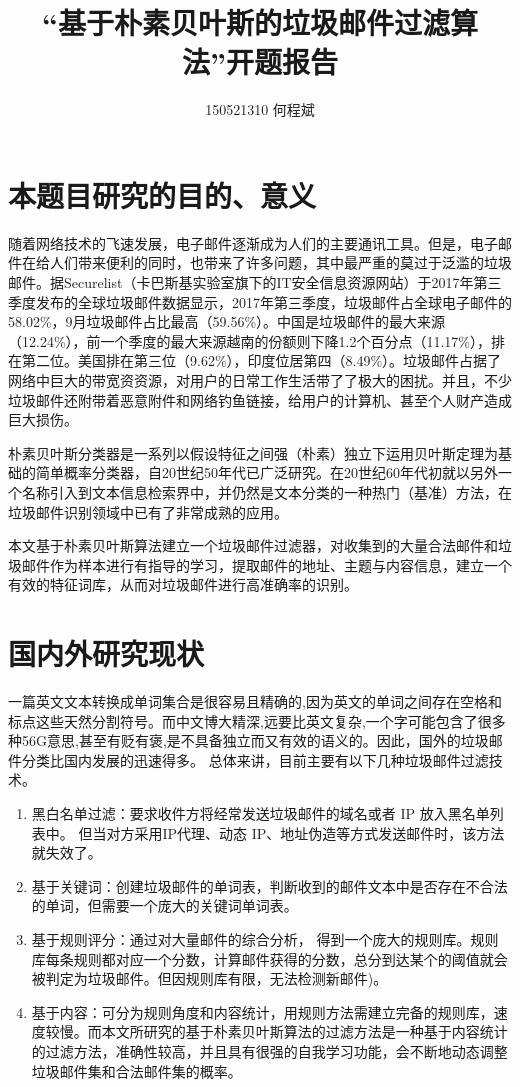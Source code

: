 \documentclass[UTF8]{ctexart}
\title{“基于朴素贝叶斯的垃圾邮件过滤算法”开题报告}
\author{150521310 何程斌}
\date{}
\begin{document}
\maketitle

\section{本题目研究的目的、意义}
随着网络技术的飞速发展，电子邮件逐渐成为人们的主要通讯工具。但是，电子邮件在给人们带来便利的同时，也带来了许多问题，其中最严重的莫过于泛滥的垃圾邮件。据Securelist（卡巴斯基实验室旗下的IT安全信息资源网站）于2017年第三季度发布的全球垃圾邮件数据显示，2017年第三季度，垃圾邮件占全球电子邮件的58.02\%，9月垃圾邮件占比最高（59.56\%）。中国是垃圾邮件的最大来源（12.24\%），前一个季度的最大来源越南的份额则下降1.2个百分点（11.17\%），排在第二位。美国排在第三位（9.62\%），印度位居第四（8.49\%）。垃圾邮件占据了网络中巨大的带宽资资源，对用户的日常工作生活带了了极大的困扰。并且，不少垃圾邮件还附带着恶意附件和网络钓鱼链接，给用户的计算机、甚至个人财产造成巨大损伤。

朴素贝叶斯分类器是一系列以假设特征之间强（朴素）独立下运用贝叶斯定理为基础的简单概率分类器，自20世纪50年代已广泛研究。在20世纪60年代初就以另外一个名称引入到文本信息检索界中\cite{ref1}，并仍然是文本分类的一种热门（基准）方法，在垃圾邮件识别领域中已有了非常成熟的应用。

本文基于朴素贝叶斯算法建立一个垃圾邮件过滤器，对收集到的大量合法邮件和垃圾邮件作为样本进行有指导的学习，提取邮件的地址、主题与内容信息，建立一个有效的特征词库，从而对垃圾邮件进行高准确率的识别。


\section{国内外研究现状}
一篇英文文本转换成单词集合是很容易且精确的,因为英文的单词之间存在空格和标点这些天然分割符号。而中文博大精深,远要比英文复杂,一个字可能包含了很多种56G意思,甚至有贬有褒,是不具备独立而又有效的语义的。因此，国外的垃圾邮件分类比国内发展的迅速得多。
总体来讲，目前主要有以下几种垃圾邮件过滤技术。
\begin{enumerate}
\item 黑白名单过滤：要求收件方将经常发送垃圾邮件的域名或者 IP 放入黑名单列表中。
但当对方采用IP代理、动态 IP、地址伪造等方式发送邮件时，该方法就失效了\cite{ref2}。
\item 基于关键词：创建垃圾邮件的单词表，判断收到的邮件文本中是否存在不合法的单词，但需要一个庞大的关键词单词表\cite{ref3}。
\item 基于规则评分：通过对大量邮件的综合分析， 得到一个庞大的规则库。规则库每条规则都对应一个分数，计算邮件获得的分数，总分到达某个的阈值就会被判定为垃圾邮件。但因规则库有限，无法检测新邮件\cite{ref3})。
\item 基于内容：可分为规则角度和内容统计，用规则方法需建立完备的规则库，速度较慢。而本文所研究的基于朴素贝叶斯算法的过滤方法是一种基于内容统计的过滤方法，准确性较高\cite{ref3}，并且具有很强的自我学习功能，会不断地动态调整垃圾邮件集和合法邮件集的概率。
\end{enumerate}
\end{document}
